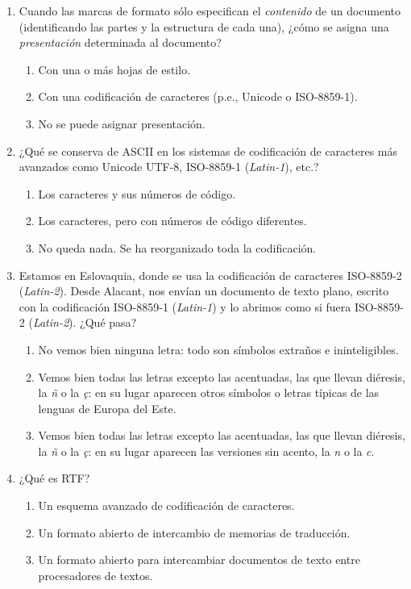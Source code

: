 \begin{enumerate}
\item Cuando las marcas de formato sólo especifican el \emph{contenido} de un documento (identificando las partes y la estructura de cada una), ¿cómo se asigna una \emph{presentación} determinada al documento? \begin{enumerate} \item Con una o más hojas de estilo. \item Con una codificación de caracteres (p.e., Unicode o ISO-8859-1). \item No se  puede asignar presentación. \end{enumerate} 

\item ¿Qué se conserva de ASCII en los sistemas de codificación de caracteres más avanzados como Unicode UTF-8, ISO-8859-1 (\emph{Latin-1}), etc.? \begin{enumerate} \item Los caracteres y sus números de código. \item Los caracteres, pero con números de código diferentes. \item No  queda nada. Se ha reorganizado toda la codificación. \end{enumerate} 

\item Estamos en Eslovaquia, donde se usa la codificación de caracteres ISO-8859-2 (\emph{Latin-2}). Desde Alacant, nos envían un documento de texto plano, escrito con la codificación ISO-8859-1 (\emph{Latin-1}) y lo abrimos como si fuera ISO-8859-2 (\emph{Latin-2}). ¿Qué pasa? \begin{enumerate} \item No vemos bien ninguna letra: todo son símbolos extraños e ininteligibles. \item Vemos bien todas las letras excepto las acentuadas, las que llevan diéresis, la  \emph{ñ} o la \emph{ç}: en su lugar aparecen otros símbolos o letras típicas de las lenguas de Europa del Este. \item Vemos bien todas las letras excepto las acentuadas, las que llevan diéresis, la \emph{ñ} o la \emph{ç}: en su lugar aparecen las versiones sin acento, la  \emph{n}  o la \emph{c}. \end{enumerate} 

\item ¿Qué es RTF? \begin{enumerate} \item Un esquema avanzado de codificación de caracteres. \item Un formato abierto de intercambio de memorias de traducción. \item Un formato abierto para intercambiar documentos de texto entre procesadores de textos. \end{enumerate} 


\end{enumerate}
